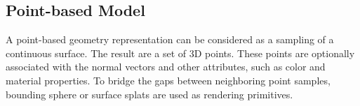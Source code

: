 \documentclass[11pt, a4paper]{report}
\begin{document}
    \subsection{Point-based Model}\label{point_based}

    A point-based geometry representation can be considered as a 
    sampling of a continuous surface.  The result are a set of 3D points. 
    These points are optionally associated with the normal vectors 
    and other attributes, such as color and material properties. 
    To bridge the gaps between neighboring point samples, 
    bounding sphere or surface splats are used as rendering primitives. 
\end{document}
